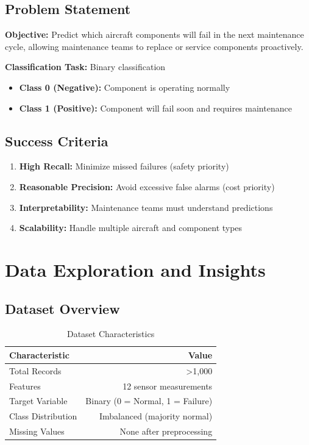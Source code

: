 \documentclass[11pt,a4paper]{article}
\begin{document}
\subsection{Problem Statement}
\textbf{Objective:} Predict which aircraft components will fail in the next maintenance cycle, allowing maintenance teams to replace or service components proactively.

\textbf{Classification Task:} Binary classification
\begin{itemize}
    \item \textbf{Class 0 (Negative):} Component is operating normally
    \item \textbf{Class 1 (Positive):} Component will fail soon and requires maintenance
\end{itemize}

\subsection{Success Criteria}
\begin{enumerate}
    \item \textbf{High Recall:} Minimize missed failures (safety priority)
    \item \textbf{Reasonable Precision:} Avoid excessive false alarms (cost priority)
    \item \textbf{Interpretability:} Maintenance teams must understand predictions
    \item \textbf{Scalability:} Handle multiple aircraft and component types
\end{enumerate}

\section{Data Exploration and Insights}

\subsection{Dataset Overview}
\begin{table}[H]
\centering
\begin{tabular}{|l|r|}
\toprule
\textbf{Characteristic} & \textbf{Value} \\
\midrule
Total Records & \textgreater 1,000 \\
Features & 12 sensor measurements \\
Target Variable & Binary (0 = Normal, 1 = Failure) \\
Class Distribution & Imbalanced (majority normal) \\
Missing Values & None after preprocessing \\
\bottomrule
\end{tabular}
\caption{Dataset Characteristics}
\end{table}
\end{document}
